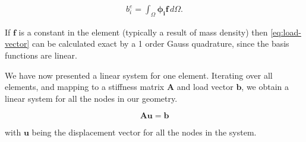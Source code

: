 \begin{align}
\label{eq:load-vector}
b^e_i = 
\int_{\Omega} \bm{\phi_i} \bm{f} \, d\Omega.
\end{align}

If $\bm{f}$ is a constant in the element (typically a result of mass density) then \eqref{eq:load-vector} can be calculated exact by a 1 order Gauss quadrature, since the basis functions are linear. 

We have now presented a linear system for one element. Iterating over all elements, and mapping to a stiffness matrix $\bm{A}$ and load vector $\bm{b}$, we obtain a linear system for all the nodes in our geometry. 

\begin{equation}
\bm{A} \bm{u} = \bm{b}
\end{equation}

with $\bm{u}$ being the displacement vector for all the nodes in the system. 